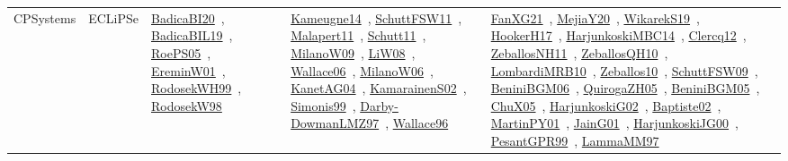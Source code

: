 {\begin{longtable}{lp{3cm}>{\raggedright\arraybackslash}p{6cm}>{\raggedright\arraybackslash}p{6cm}>{\raggedright\arraybackslash}p{8cm}}
\index{ECLiPSe}\index{CPSystems!ECLiPSe}CPSystems & ECLiPSe & \href{../works/BadicaBI20.pdf}{BadicaBI20}~\cite{BadicaBI20}, \href{../works/BadicaBIL19.pdf}{BadicaBIL19}~\cite{BadicaBIL19}, \href{../works/RoePS05.pdf}{RoePS05}~\cite{RoePS05}, \href{../works/EreminW01.pdf}{EreminW01}~\cite{EreminW01}, \href{../works/RodosekWH99.pdf}{RodosekWH99}~\cite{RodosekWH99}, \href{../works/RodosekW98.pdf}{RodosekW98}~\cite{RodosekW98} & \href{../works/Kameugne14.pdf}{Kameugne14}~\cite{Kameugne14}, \href{../works/SchuttFSW11.pdf}{SchuttFSW11}~\cite{SchuttFSW11}, \href{../works/Malapert11.pdf}{Malapert11}~\cite{Malapert11}, \href{../works/Schutt11.pdf}{Schutt11}~\cite{Schutt11}, \href{../works/MilanoW09.pdf}{MilanoW09}~\cite{MilanoW09}, \href{../works/LiW08.pdf}{LiW08}~\cite{LiW08}, \href{../works/Wallace06.pdf}{Wallace06}~\cite{Wallace06}, \href{../works/MilanoW06.pdf}{MilanoW06}~\cite{MilanoW06}, \href{../works/KanetAG04.pdf}{KanetAG04}~\cite{KanetAG04}, \href{../works/KamarainenS02.pdf}{KamarainenS02}~\cite{KamarainenS02}, \href{../works/Simonis99.pdf}{Simonis99}~\cite{Simonis99}, \href{../works/Darby-DowmanLMZ97.pdf}{Darby-DowmanLMZ97}~\cite{Darby-DowmanLMZ97}, \href{../works/Wallace96.pdf}{Wallace96}~\cite{Wallace96} & \href{../works/FanXG21.pdf}{FanXG21}~\cite{FanXG21}, \href{../works/MejiaY20.pdf}{MejiaY20}~\cite{MejiaY20}, \href{../works/WikarekS19.pdf}{WikarekS19}~\cite{WikarekS19}, \href{../works/HookerH17.pdf}{HookerH17}~\cite{HookerH17}, \href{../works/HarjunkoskiMBC14.pdf}{HarjunkoskiMBC14}~\cite{HarjunkoskiMBC14}, \href{../works/Clercq12.pdf}{Clercq12}~\cite{Clercq12}, \href{../works/ZeballosNH11.pdf}{ZeballosNH11}~\cite{ZeballosNH11}, \href{../works/ZeballosQH10.pdf}{ZeballosQH10}~\cite{ZeballosQH10}, \href{../works/LombardiMRB10.pdf}{LombardiMRB10}~\cite{LombardiMRB10}, \href{../works/Zeballos10.pdf}{Zeballos10}~\cite{Zeballos10}, \href{../works/SchuttFSW09.pdf}{SchuttFSW09}~\cite{SchuttFSW09}, \href{../works/BeniniBGM06.pdf}{BeniniBGM06}~\cite{BeniniBGM06}, \href{../works/QuirogaZH05.pdf}{QuirogaZH05}~\cite{QuirogaZH05}, \href{../works/BeniniBGM05.pdf}{BeniniBGM05}~\cite{BeniniBGM05}, \href{../works/ChuX05.pdf}{ChuX05}~\cite{ChuX05}, \href{../works/HarjunkoskiG02.pdf}{HarjunkoskiG02}~\cite{HarjunkoskiG02}, \href{../works/Baptiste02.pdf}{Baptiste02}~\cite{Baptiste02}, \href{../works/MartinPY01.pdf}{MartinPY01}~\cite{MartinPY01}, \href{../works/JainG01.pdf}{JainG01}~\cite{JainG01}, \href{../works/HarjunkoskiJG00.pdf}{HarjunkoskiJG00}~\cite{HarjunkoskiJG00}, \href{../works/PesantGPR99.pdf}{PesantGPR99}~\cite{PesantGPR99}, \href{../works/LammaMM97.pdf}{LammaMM97}~\cite{LammaMM97}\\

\end{longtable}}
